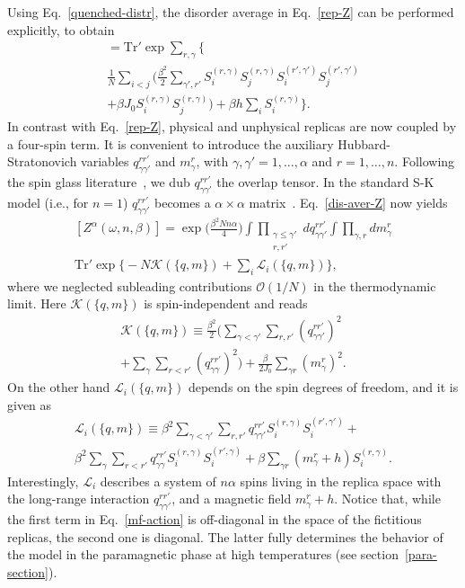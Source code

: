 \documentclass[twocolumn,superscriptaddress,prb,10pt]{revtex4-1}
\def\tr{\textrm{Tr}}
\begin{document}
Using Eq.~\eqref{quenched-distr}, the disorder average in Eq.~\eqref{rep-Z} 
can be performed explicitly, to obtain 
%
\begin{multline}
[Z^\alpha(\omega,n,\beta)]=\tr'\exp\sum\limits_{r,\gamma}\Big\{\\
\frac{1}{N}
\sum\limits_{i<j}\Big(
\frac{\beta^2}{2}\sum\limits_{\gamma',r'}S^{(r,\gamma)}_iS^{(r,\gamma)}_j
S^{(r',\gamma')}_iS^{(r',\gamma')}_j\\
+\beta J_0 S_i^{(r,\gamma)}S_j^{(r,\gamma)}\Big)
+\beta h\sum\limits_{i}
S_i^{(r,\gamma)}\Big\}.
\label{dis-aver-Z}
\end{multline}
%
In contrast with Eq.~\eqref{rep-Z}, physical and unphysical replicas are 
now coupled by a four-spin term. It is convenient to introduce the auxiliary 
Hubbard-Stratonovich variables $q_{\gamma\gamma'}^{rr'}$ and $m_\gamma^r$, 
with $\gamma,\gamma'=1,\dots,\alpha$ and $r=1,\dots,n$. Following the spin 
glass literature~\cite{parisi-book}, we dub $q_{\gamma\gamma'}^{rr'}$ the 
overlap tensor. In the standard S-K model (i.e., for $n=1$) 
$q_{\gamma\gamma'}^{rr'}$ becomes a $\alpha\times\alpha$ 
matrix~\cite{sherrington-1978-prl}. Eq.~\eqref{dis-aver-Z} now 
yields  
%
\begin{multline}
\label{hs-Z}
[Z^\alpha(\omega,n,\beta)]=\exp\Big(\frac{\beta^2Nn\alpha}{4}\Big)
\int\prod_{\substack{\gamma\le\gamma'\\r,r'}}
dq^{rr'}_{\gamma\gamma'}
\int\prod_{\gamma,r}dm_\gamma^r\\
\tr'\exp
\Big\{-N {\mathcal K}(\{q,m\})
+\sum_i{\mathcal L}_i(\{q,m\})\Big\},
\end{multline}
%
where we neglected subleading contributions ${\mathcal O}(1/N)$ in 
the thermodynamic limit. Here ${\mathcal K}(\{q,m\})$ is spin-independent 
and reads 
%
\begin{multline}
{\mathcal K}(\{q,m\})\equiv 
\frac{\beta^2}{2}\Big(\sum\limits_{\gamma<\gamma'}\sum
\limits_{r,r'} (q_{\gamma\gamma'}^{rr'})^2
\\
+\sum\limits_{\gamma}\sum\limits_{r<r'}(q_{\gamma\gamma}^{
rr'})^2\Big)
+\frac{\beta}{2 J_0}\sum\limits_{\gamma r}(m_\gamma^r)^2. 
\label{Gamma}
\end{multline}
%
On the other hand ${\mathcal L}_i(\{q,m\})$ depends on the spin degrees of 
freedom, and it is given as   
%
\begin{multline}
{\mathcal L}_i(\{q,m\})
\equiv\beta^2\sum\limits_{\gamma<\gamma'}\sum\limits_{r,r'}
q_{\gamma\gamma'}^{rr'}S_i^{(r,\gamma)}
S_i^{(r',\gamma')}+\\
\beta^2\sum_\gamma\sum\limits_{r<r'}
q_{\gamma\gamma}^{rr'}S^{(r,\gamma)}_i
S^{(r',\gamma)}_i
+\beta\sum\limits_{\gamma r}(m_\gamma^r+h)
S_i^{(r,\gamma)}.
\label{mf-action}
\end{multline}
%
Interestingly, ${\mathcal L}_i$ describes a system of $n\alpha$ spins living 
in the replica space with the long-range interaction $q_{\gamma\gamma'}^{rr'}$, 
and a magnetic field $m_\gamma^r+h$. Notice that, while the first term in 
Eq.~\eqref{mf-action} is off-diagonal in the space of the fictitious replicas, 
the second one is diagonal. The latter fully determines the behavior of the model 
in the paramagnetic phase at high temperatures (see section~\ref{para-section}). 
\end{document}
